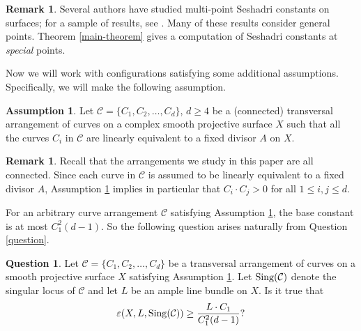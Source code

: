 \documentclass[12pt,reqno]{amsart}
\theoremstyle{plain}
\numberwithin{equation}{section}
\theoremstyle{definition}
\newtheorem{question}[theorem]{Question}
\newtheorem{remark}[theorem]{Remark}
\newtheorem{assumption}[theorem]{Assumption}
\begin{document}
\begin{remark}
Several authors have studied multi-point Seshadri constants on surfaces; for a sample of results, see \cite{B,HM, HR, PR, RR, SS}. 
Many of these results consider general points. 
Theorem \ref{main-theorem} gives a computation of Seshadri constants at \textit{special} points. 
\end{remark}


Now we will work with configurations satisfying some additional assumptions. Specifically, we will make the following assumption. 

	\begin{assumption}\label{star1}
		Let $\mathcal{C}=\{C_1,C_2, \ldots ,C_d\}$, $d\geq 4$ be a (connected) 
  transversal arrangement of curves 
		on a complex smooth projective surface $X$ such that all the curves 
  $C_i$ in $\mathcal{C}$ are linearly equivalent to a
			fixed divisor $A$ on $X$.
	\end{assumption}

 \begin{remark} 
Recall that the arrangements we study in this paper are all connected. Since each curve in $\mathcal{C}$ is assumed to be linearly equivalent to a fixed divisor $A$, 
Assumption \ref{star1} implies in particular that $C_i\cdot C_j > 0$ for all $1\le i,j \le d$.  
 \end{remark}
	




For an arbitrary curve arrangement $\mathcal{C}$ satisfying Assumption \ref{star1}, the base constant is at most 
$C_1^2(d-1)$. So the following question arises naturally from
Question \ref{question}. 

	\begin{question}\label{QuestM}
		Let $\mathcal{C} =\{C_1,C_2, \ldots ,C_d\}$ be a transversal arrangement of curves on a smooth projective surface $X$
		satisfying Assumption \ref{star1}. Let  ${\rm Sing}(\mathcal{C})$ denote the singular locus of $\mathcal{C}$ and let $L$ be an ample line bundle on $X$. Is it true that
		\begin{equation}\label{ques}
			\varepsilon(X, L,{\rm Sing}(\mathcal{C})) \geq \frac{L \cdot C_1}{C_1^2(d-1)} ?	
		\end{equation}	
		
	\end{question}	
	
\end{document}
